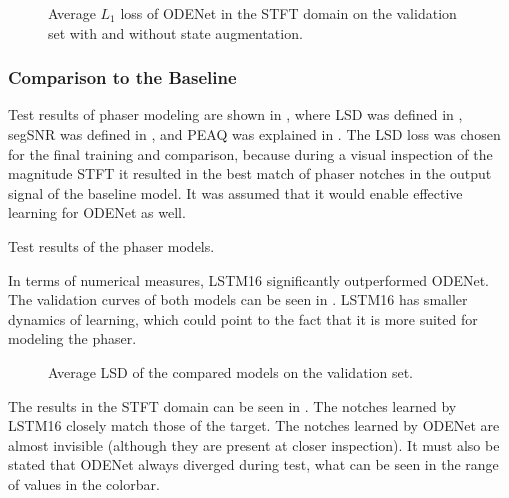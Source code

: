 \begin{figure}
    \centering
    
    \caption{Average $L_1$ loss of ODENet in the \ac{STFT} domain on the validation set with and without state augmentation.}
    \label{fig:state_augmentation}
\end{figure}

\subsubsection{Comparison to the Baseline}

Test results of phaser modeling are shown in , where \ac{LSD} was defined in , \ac{segSNR} was defined in , and \ac{PEAQ} was explained in . The \ac{LSD}  loss was chosen for the final training and comparison, because during a visual inspection of the magnitude \ac{STFT} it resulted in the best match of phaser notches in the output signal of the baseline model. It was assumed that it would enable effective learning for ODENet as well.

\begin{table}[]
    \centering
    
    \caption{Test results of the phaser models.}
    \label{tab:phaser_results}
\end{table}

In terms of numerical measures, \ac{LSTM}16 significantly outperformed ODENet. The validation curves of both models can be seen in . \ac{LSTM}16 has smaller dynamics of learning, which could point to the fact that it is more suited for modeling the phaser.

\begin{figure}
    \centering
    
    \caption{Average \ac{LSD} of the compared models on the validation set.}
    \label{fig:phaser_lstm_vs_fe}
\end{figure}

The results in the \ac{STFT} domain can be seen in . The notches learned by \ac{LSTM}16 closely match those of the target. The notches learned by ODENet are almost invisible (although they are present at closer inspection). It must also be stated that ODENet always diverged during test, what can be seen in the range of values in the colorbar.

